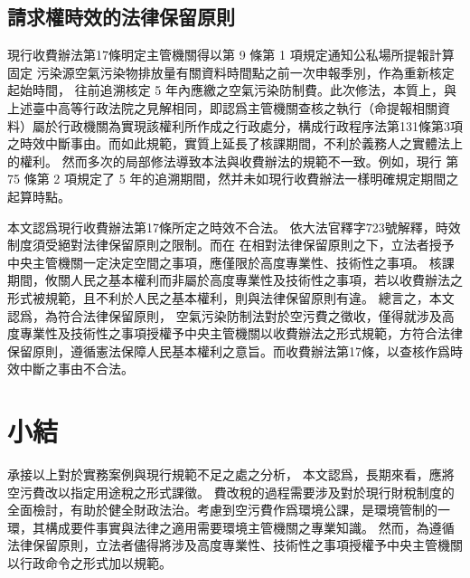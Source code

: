 \documentclass[11pt,a4paper]{article}
\begin{document}
\subsection{請求權時效的法律保留原則}


現行收費辦法第17條明定主管機關得以第 9 條第 1 項規定通知公私場所提報計算固定
污染源空氣污染物排放量有關資料時間點之前一次申報季別，作為重新核定起始時間，
往前追溯核定 5 年內應繳之空氣污染防制費。此次修法，本質上，與上述臺中高等行政法院之見解相同，即認爲主管機關查核之執行（命提報相關資料）屬於行政機關為實現該權利所作成之行政處分，構成行政程序法第131條第3項之時效中斷事由。而如此規範，實質上延長了核課期間，不利於義務人之實體法上的權利。
然而多次的局部修法導致本法與收費辦法的規範不一致。例如，現行
第 75 條第 2 項規定了 5 年的追溯期間，然并未如現行收費辦法一樣明確規定期間之起算時點。

本文認爲現行收費辦法第17條所定之時效不合法。
依大法官釋字723號解釋，時效制度須受絕對法律保留原則之限制。而在
在相對法律保留原則之下，立法者授予中央主管機關一定決定空間之事項，應僅限於高度專業性、技術性之事項。
核課期間，攸關人民之基本權利而非屬於高度專業性及技術性之事項，若以收費辦法之形式被規範，且不利於人民之基本權利，則與法律保留原則有違。
總言之，本文認爲，為符合法律保留原則，
空氣污染防制法對於空污費之徵收，僅得就涉及高度專業性及技術性之事項授權予中央主管機關以收費辦法之形式規範，方符合法律保留原則，遵循憲法保障人民基本權利之意旨。而收費辦法第17條，以查核作爲時效中斷之事由不合法。


\section{小結}







承接以上對於實務案例與現行規範不足之處之分析，
本文認爲，長期來看，應將空污費改以指定用途稅之形式課徵。
費改稅的過程需要涉及對於現行財稅制度的全面檢討，有助於健全財政法治。考慮到空污費作爲環境公課，是環境管制的一環，其構成要件事實與法律之適用需要環境主管機關之專業知識。
然而，為遵循法律保留原則，立法者儘得將涉及高度專業性、技術性之事項授權予中央主管機關以行政命令之形式加以規範。
\end{document}
